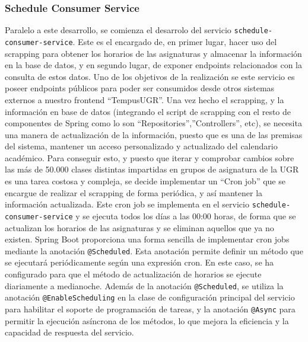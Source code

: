 \subsubsection{Schedule Consumer Service}
Paralelo a este desarrollo, se comienza el desarrolo del servicio \texttt{schedule-consumer-service}. Este es el encargado de, en primer lugar, hacer uso del scrapping para obtener los horarios de las asignaturas y almacenar la información en la base de datos, y en segundo lugar, de exponer endpoints relacionados con la consulta de estos datos. Uno de los objetivos de la realización se este servicio es poseer endpoints públicos para poder ser consumidos desde otros sistemas externos a nuestro frontend ``TempusUGR''.
\newline\newline
Una vez hecho el scrapping, y la información en base de datos (integrando el script de scrapping con el resto de componentes de Spring como lo son ``Repositories'',''Controllers'', etc), se necesita una manera de actualización de la información, puesto que es una de las premisas del sistema, mantener un acceso personalizado y actualizado del calendario académico.\newline
Para conseguir esto, y puesto que iterar y comprobar cambios sobre las más de 50.000 clases distintas impartidas en grupos de asignatura de la UGR es una tarea costosa y compleja, se decide implementar un ``\hypertarget{cronjob}{Cron job}'' que se encargue de realizar el scrapping de forma periódica, y así mantener la información actualizada. Este cron job se implementa en el servicio \texttt{schedule-consumer-service} y se ejecuta todos los días a las 00:00 horas, de forma que se actualizan los horarios de las asignaturas y se eliminan aquellos que ya no existen.
\newline\newline
Spring Boot proporciona una forma sencilla de implementar cron jobs mediante la anotación \texttt{@Scheduled}. Esta anotación permite definir un método que se ejecutará periódicamente según una expresión cron. En este caso, se ha configurado para que el método de actualización de horarios se ejecute diariamente a medianoche. Además de la anotación \texttt{@Scheduled}, se utiliza la anotación \texttt{@EnableScheduling} en la clase de configuración principal del servicio para habilitar el soporte de programación de tareas, y la anotación \texttt{@Async} para permitir la ejecución asíncrona de los métodos, lo que mejora la eficiencia y la capacidad de respuesta del servicio.
\newline
